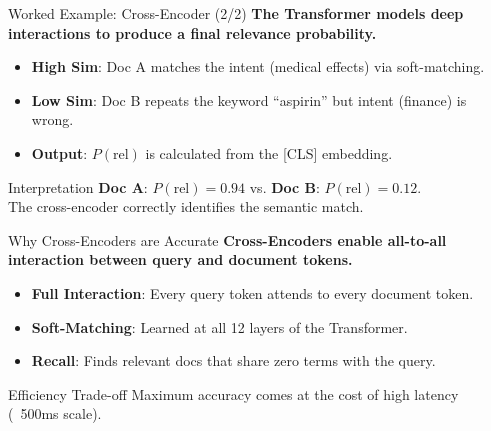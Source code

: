 \documentclass[aspectratio=169]{beamer}
\newif\ifanimated
\newcommand{\cpause}{\ifanimated\pause\fi}
\begin{document}
\begin{frame}{Worked Example: Cross-Encoder (2/2)}
\textbf{The Transformer models deep interactions to produce a final relevance probability.}

\vspace{0.8em}
\begin{itemize}
    \item \textbf{High Sim}: Doc A matches the intent (medical effects) via soft-matching.
    \item \textbf{Low Sim}: Doc B repeats the keyword ``aspirin'' but intent (finance) is wrong.
    \item \textbf{Output}: $P(\text{rel})$ is calculated from the [CLS] embedding.
\end{itemize}

\vspace{1em}
\cpause
\begin{exampleblock}{Interpretation}
\textbf{Doc A}: $P(\text{rel}) = \mathbf{0.94}$ \quad vs. \quad \textbf{Doc B}: $P(\text{rel}) = \mathbf{0.12}$.\\
The cross-encoder correctly identifies the semantic match.
\end{exampleblock}
\end{frame}



\begin{frame}{Why Cross-Encoders are Accurate}
\textbf{Cross-Encoders enable all-to-all interaction between query and document tokens.}

\vspace{0.8em}
\begin{itemize}
    \item \textbf{Full Interaction}: Every query token attends to every document token.
    \item \textbf{Soft-Matching}: Learned at all 12 layers of the Transformer.
    \item \textbf{Recall}: Finds relevant docs that share zero terms with the query.
\end{itemize}

\vspace{1em}
\cpause
\begin{exampleblock}{Efficiency Trade-off}
Maximum accuracy comes at the cost of high latency (~500ms scale).
\end{exampleblock}
\end{frame}
\end{document}
